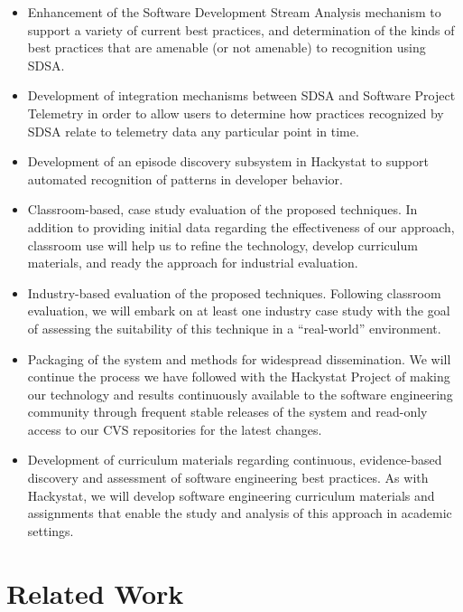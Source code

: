 \begin{itemize}
  
\item Enhancement of the Software Development Stream Analysis mechanism to
  support a variety of current best practices, and determination of the
  kinds of best practices that are amenable (or not amenable) to
  recognition using SDSA.

\item Development of integration mechanisms between SDSA and Software
  Project Telemetry in order to allow users to determine how practices
  recognized by SDSA relate to telemetry data any particular point in time.
  
\item Development of an episode discovery subsystem in Hackystat to support
  automated recognition of patterns in developer behavior.
  
\item Classroom-based, case study evaluation of the proposed techniques. In
  addition to providing initial data regarding the effectiveness of our
  approach, classroom use will help us to refine the technology, develop
  curriculum materials, and ready the approach for industrial evaluation.
  
\item Industry-based evaluation of the proposed techniques. Following
  classroom evaluation, we will embark on at least one industry case study
  with the goal of assessing the suitability of this technique in a
  ``real-world'' environment.
  
\item Packaging of the system and methods for widespread dissemination. We
  will continue the process we have followed with the Hackystat Project of
  making our technology and results continuously available to the software
  engineering community through frequent stable releases of the system and
  read-only access to our CVS repositories for the latest changes.  
  
\item Development of curriculum materials regarding continuous,
  evidence-based discovery and assessment of software engineering best
  practices. As with Hackystat, we will develop software engineering
  curriculum materials and assignments that enable the study and analysis
  of this approach in academic settings.

\end{itemize}


\section{Related Work}

